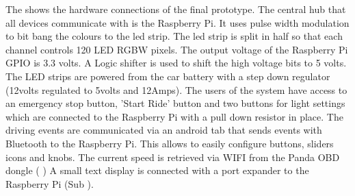 The   shows the hardware connections of the final prototype. The central hub that all devices communicate with is the Raspberry Pi. It uses pulse width modulation to bit bang the colours to the led strip. The led strip is split in half so that each channel controls 120 LED RGBW pixels. The output voltage of the Raspberry Pi GPIO is 3.3 volts. A Logic shifter is used to shift the high voltage bits to 5 volts. The LED strips are powered from the car battery with a step down regulator (12volts regulated to 5volts and 12Amps). The users of the system have access to an emergency stop button, 'Start Ride' button and two buttons for light settings which are connected to the Raspberry Pi with a pull down resistor in place.  The driving events are communicated via an android tab that sends events with Bluetooth to the Raspberry Pi. This allows to easily configure buttons, sliders icons and knobs. The current speed is retrieved via WIFI from the Panda OBD dongle ( ) A small text display is connected with a port expander to the Raspberry Pi (Sub ). 

